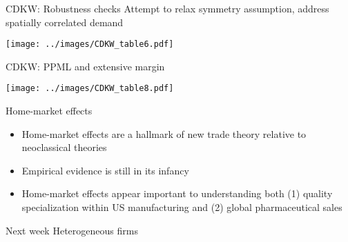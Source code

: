 \documentclass[10pt,notes=hide]{beamer}
\begin{document}
\begin{frame}{CDKW: Robustness checks}
Attempt to relax symmetry assumption, address spatially correlated demand
\begin{center}\texttt{[image: ../images/CDKW\_table6.pdf]}\end{center}
\end{frame}
\begin{frame}{CDKW: PPML and extensive margin}
\begin{center}\texttt{[image: ../images/CDKW\_table8.pdf]}\end{center}
\end{frame}
\begin{frame}{Home-market effects}
\begin{itemize}
	\item Home-market effects are a hallmark of new trade theory relative to neoclassical theories
	\item Empirical evidence is still in its infancy
	\item Home-market effects appear important to understanding both (1) quality specialization within US manufacturing and (2) global pharmaceutical sales
\end{itemize}
\end{frame}
\begin{frame}{Next week}
Heterogeneous firms
\end{frame}
\end{document}
